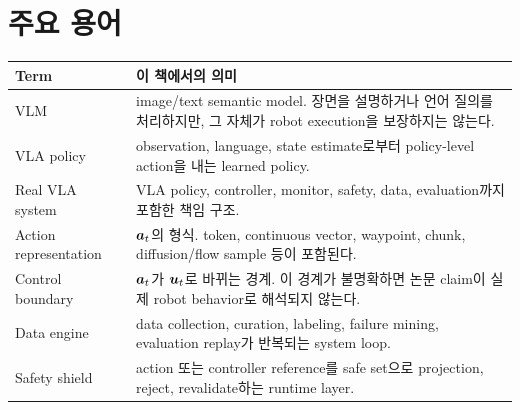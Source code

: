 \section*{주요 용어}

\begin{center}
\small
\begin{tabularx}{\textwidth}{@{}p{}p{}@{}}
\toprule
Term & 이 책에서의 의미 \\
\midrule
VLM & image/text semantic model. 장면을 설명하거나 언어 질의를 처리하지만, 그 자체가 robot execution을 보장하지는 않는다. \\
VLA policy & observation, language, state estimate로부터 policy-level action을 내는 learned policy. \\
Real VLA system & VLA policy, controller, monitor, safety, data, evaluation까지 포함한 책임 구조. \\
Action representation & $\bm{a}_t$의 형식. token, continuous vector, waypoint, chunk, diffusion/flow sample 등이 포함된다. \\
Control boundary & $\bm{a}_t$가 $\bm{u}_t$로 바뀌는 경계. 이 경계가 불명확하면 논문 claim이 실제 robot behavior로 해석되지 않는다. \\
Data engine & data collection, curation, labeling, failure mining, evaluation replay가 반복되는 system loop. \\
Safety shield & action 또는 controller reference를 safe set으로 projection, reject, revalidate하는 runtime layer. \\
\bottomrule
\end{tabularx}
\end{center}
